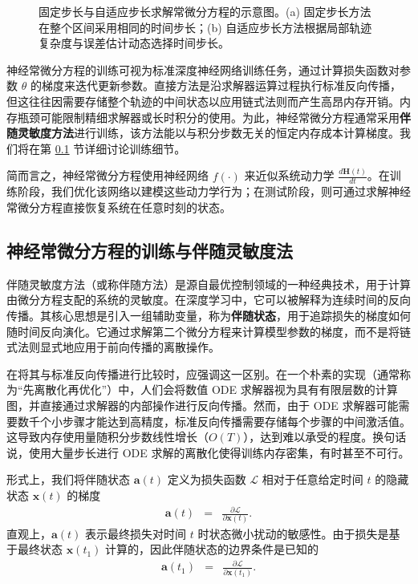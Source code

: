 \begin{figure}[!t]
\centering
{}
\caption{固定步长与自适应步长求解常微分方程的示意图。(a) 固定步长方法在整个区间采用相同的时间步长；(b) 自适应步长方法根据局部轨迹复杂度与误差估计动态选择时间步长。}
\label{fig:fixed-step-size-vs-adaptive-step-size}
\end{figure}

神经常微分方程的训练可视为标准深度神经网络训练任务，通过计算损失函数对参数 $\theta$ 的梯度来迭代更新参数。直接方法是沿求解器运算过程执行标准反向传播，但这往往因需要存储整个轨迹的中间状态以应用链式法则而产生高昂内存开销。内存瓶颈可能限制精细求解器或长时积分的使用。为此，神经常微分方程通常采用\textbf{伴随灵敏度方法}进行训练，该方法能以与积分步数无关的恒定内存成本计算梯度。我们将在第 \ref{sec:neuralode-training} 节详细讨论训练细节。

简而言之，神经常微分方程使用神经网络 $f(\cdot)$ 来近似系统动力学 $\frac{d \mathbf{H}(t)}{d t}$。在训练阶段，我们优化该网络以建模这些动力学行为；在测试阶段，则可通过求解神经常微分方程直接恢复系统在任意时刻的状态。

\subsection{神经常微分方程的训练与伴随灵敏度法}
\label{sec:neuralode-training}
伴随灵敏度方法（或称伴随方法）是源自最优控制领域的一种经典技术，用于计算由微分方程支配的系统的灵敏度。在深度学习中，它可以被解释为连续时间的反向传播。其核心思想是引入一组辅助变量，称为\textbf{伴随状态}，用于追踪损失的梯度如何随时间反向演化。它通过求解第二个微分方程来计算模型参数的梯度，而不是将链式法则显式地应用于前向传播的离散操作。

在将其与标准反向传播进行比较时，应强调这一区别。在一个朴素的实现（通常称为“先离散化再优化”）中，人们会将数值 ODE 求解器视为具有有限层数的计算图，并直接通过求解器的内部操作进行反向传播。然而，由于 ODE 求解器可能需要数千个小步骤才能达到高精度，标准反向传播需要存储每个步骤的中间激活值。这导致内存使用量随积分步数线性增长（$O(T)$），达到难以承受的程度。换句话说，使用大量步长进行 ODE 求解的离散化使得训练内存密集，有时甚至不可行。

形式上，我们将伴随状态 $\mathbf{a}(t)$ 定义为损失函数 $\mathcal{L}$ 相对于任意给定时间 $t$ 的隐藏状态 $\mathbf{x}(t)$ 的梯度
\begin{eqnarray}
\mathbf{a}(t) & = & \frac{\partial \mathcal{L}}{\partial \mathbf{x}(t)}.
\end{eqnarray}
直观上，$\mathbf{a}(t)$ 表示最终损失对时间 $t$ 时状态微小扰动的敏感性。由于损失是基于最终状态 $\mathbf{x}(t_1)$ 计算的，因此伴随状态的边界条件是已知的
\begin{eqnarray}
\mathbf{a}(t_1) & = & \frac{\partial \mathcal{L}}{\partial \mathbf{x}(t_1)}.
\end{eqnarray}

